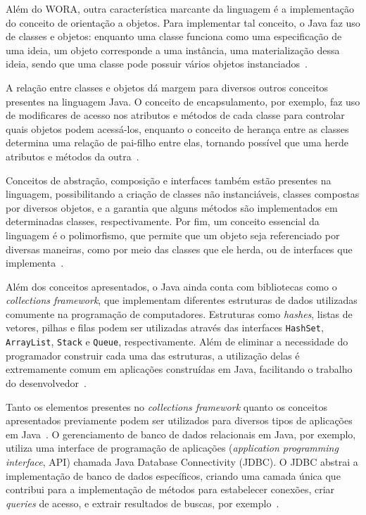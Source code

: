 Além do WORA, outra característica marcante da linguagem é a implementação do conceito de orientação a objetos. Para implementar tal conceito, o Java faz uso de classes e objetos: enquanto uma classe funciona como uma especificação de uma ideia, um objeto corresponde a uma instância, uma materialização dessa ideia, sendo que uma classe pode possuir vários objetos instanciados~\cite{ocastudyguide-2015}.

A relação entre classes e objetos dá margem para diversos outros conceitos presentes na linguagem Java. O conceito de encapsulamento, por exemplo, faz uso de modificares de acesso nos atributos e métodos de cada classe para controlar quais objetos podem acessá-los, enquanto o conceito de herança entre as classes determina uma relação de pai-filho entre elas, tornando possível que uma herde atributos e métodos da outra~\cite{ocastudyguide-2015}.

Conceitos de abstração, composição e interfaces também estão presentes na linguagem, possibilitando a criação de classes não instanciáveis, classes compostas por diversos objetos, e a garantia que alguns métodos são implementados em determinadas classes, respectivamente. Por fim, um conceito essencial da linguagem é o polimorfismo, que permite que um objeto seja referenciado por diversas maneiras, como por meio das classes que ele herda, ou de interfaces que implementa~\cite{ocastudyguide-2015}.

Além dos conceitos apresentados, o Java ainda conta com bibliotecas como o \textit{collections framework}, que implementam diferentes estruturas de dados utilizadas comumente na programação de computadores. Estruturas como \textit{hashes}, listas de vetores, pilhas e filas podem ser utilizadas através das interfaces \verb|HashSet|, \verb|ArrayList|, \verb|Stack| e \verb|Queue|, respectivamente. Além de eliminar a necessidade do programador construir cada uma das estruturas, a utilização delas é extremamente comum em aplicações construídas em Java, facilitando o trabalho do desenvolvedor~\cite{javacollections-2001}.

Tanto os elementos presentes no \textit{collections framework} quanto os conceitos apresentados previamente podem ser utilizados para diversos tipos de aplicações em Java~\cite{javacollections-2001}. O gerenciamento de banco de dados relacionais em Java, por exemplo, utiliza uma interface de programação de aplicações (\textit{application programming interface}, API) chamada Java Database Connectivity (JDBC). O JDBC abstrai a implementação de banco de dados específicos, criando uma camada única que contribui para a implementação de métodos para estabelecer conexões, criar \textit{queries} de acesso, e extrair resultados de buscas, por exemplo~\cite{databaseprogramming-2000}.

